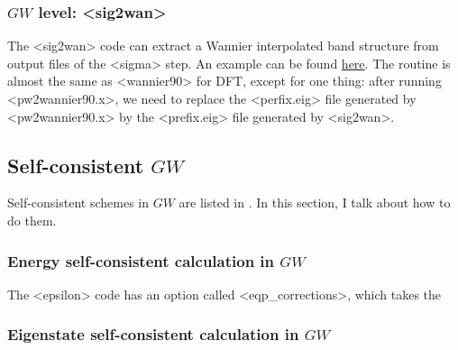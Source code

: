 \documentclass[hyperref, a4paper, 12pt]{report}
\def\texttt#1{<#1>}%
\newcommand{\shortcode}[1]{\texttt{#1}}
\begin{document}
\subsubsection{$GW$ level: \shortcode{sig2wan}}

The \shortcode{sig2wan} code can extract a Wannier interpolated band structure from 
output files of the \shortcode{sigma} step.
An example can be found 
\href{https://github.com/BerkeleyGW/BerkeleyGW-examples/tree/master/DFT/silicon}{here}.
The routine is almost the same as \shortcode{wannier90} for DFT,
except for one thing:
after running \shortcode{pw2wannier90.x},
we need to replace the \shortcode{perfix.eig} file generated by \shortcode{pw2wannier90.x}
by the \shortcode{prefix.eig} file generated by \shortcode{sig2wan}.

\subsection{Self-consistent $GW$}

Self-consistent schemes in $GW$ are listed in .
In this section, 
I talk about how to do them.

\subsubsection{Energy self-consistent calculation in $GW$}

The \shortcode{epsilon} code has an option called \shortcode{eqp_corrections},
which takes the 

\subsubsection{Eigenstate self-consistent calculation in $GW$}
\end{document}
